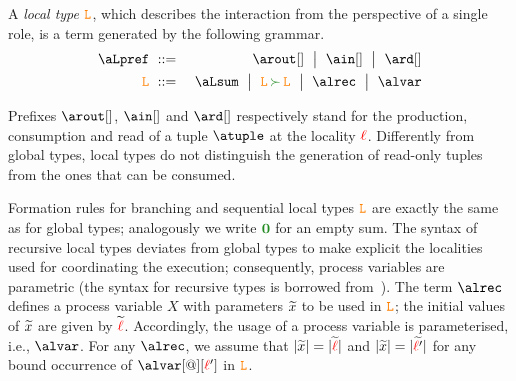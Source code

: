 %

A {\em local type} $\texttt{\textcolor{orange}L}$, which describes the interaction from the perspective of a single 
role,  is a term generated by the following grammar.
\begin{eqnarray*}
  \aLpref & \bnfdef &
                  \arout[]\bnfmid
                  \ain[] \bnfmid
                  \ard[] 
\\
  \aL & \bnfdef &
                  \aLsum \bnfmid
                  \aL \seqop \aL \bnfmid
                   \alrec \bnfmid
  	        \alvar%
\end{eqnarray*}

Prefixes $\arout[]$, $\ain[]$ and $\ard[]$ respectively stand for the
production, consumption and read of a tuple $\atuple$ at the locality
${\color{red}\ell}$. Differently from global types, local types do not
distinguish the generation of read-only tuples from the ones that can
be consumed.

Formation rules for branching and sequential local types $\texttt{\textcolor{orange}L}$ are exactly the same as for 
global types; analogously we write $\nil$ for an empty sum. 
The syntax of recursive local types  deviates from global types to make 
explicit the localities used for coordinating the execution;
consequently, process 
variables are parametric (the syntax for recursive types is borrowed from~\cite{}).
The term $\alrec$ defines a process variable $X$ with parameters $\widetilde{x}$ to 
be used in $\texttt{\textcolor{orange}L}$; the initial values of $\widetilde{x}$ are given by $\widetilde{{\color{red}\ell}}$. Accordingly, 
the usage of a process variable is parameterised, i.e., $\alvar$.  For any $\alrec$, we assume that 
 $|\widetilde{x}| = |\widetilde{{\color{red}\ell}}|$ and  $|\widetilde{x}| = |\widetilde{{\color{red}\ell}'}|$ for any bound occurrence of $\alvar[@][\alocvar']$ in $\texttt{\textcolor{orange}L}$.


